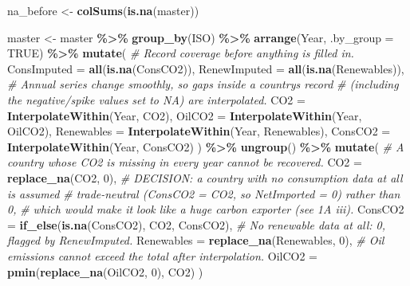 \documentclass[
]{article}
\newenvironment{Shaded}{\begin{snugshade}}{\end{snugshade}}
\newcommand{\AttributeTok}[1]{\textcolor[rgb]{0.13,0.29,0.53}{#1}}
\newcommand{\CommentTok}[1]{\textcolor[rgb]{0.56,0.35,0.01}{\textit{#1}}}
\newcommand{\ConstantTok}[1]{\textcolor[rgb]{0.56,0.35,0.01}{#1}}
\newcommand{\DecValTok}[1]{\textcolor[rgb]{0.00,0.00,0.81}{#1}}
\newcommand{\FunctionTok}[1]{\textcolor[rgb]{0.13,0.29,0.53}{\textbf{#1}}}
\newcommand{\NormalTok}[1]{#1}
\newcommand{\OtherTok}[1]{\textcolor[rgb]{0.56,0.35,0.01}{#1}}
\newcommand{\SpecialCharTok}[1]{\textcolor[rgb]{0.81,0.36,0.00}{\textbf{#1}}}
\begin{document}
\begin{Shaded}
\begin{Highlighting}[]
\NormalTok{na\_before }\OtherTok{\textless{}{-}} \FunctionTok{colSums}\NormalTok{(}\FunctionTok{is.na}\NormalTok{(master))}

\NormalTok{master }\OtherTok{\textless{}{-}}\NormalTok{ master }\SpecialCharTok{\%\textgreater{}\%}
  \FunctionTok{group\_by}\NormalTok{(ISO) }\SpecialCharTok{\%\textgreater{}\%}
  \FunctionTok{arrange}\NormalTok{(Year, }\AttributeTok{.by\_group =} \ConstantTok{TRUE}\NormalTok{) }\SpecialCharTok{\%\textgreater{}\%}
  \FunctionTok{mutate}\NormalTok{(}
    \CommentTok{\# Record coverage before anything is filled in.}
    \AttributeTok{ConsImputed =} \FunctionTok{all}\NormalTok{(}\FunctionTok{is.na}\NormalTok{(ConsCO2)),}
    \AttributeTok{RenewImputed =} \FunctionTok{all}\NormalTok{(}\FunctionTok{is.na}\NormalTok{(Renewables)),}
    \CommentTok{\# Annual series change smoothly, so gaps inside a country\textquotesingle{}s record}
    \CommentTok{\# (including the negative/spike values set to NA) are interpolated.}
    \AttributeTok{CO2 =} \FunctionTok{InterpolateWithin}\NormalTok{(Year, CO2),}
    \AttributeTok{OilCO2 =} \FunctionTok{InterpolateWithin}\NormalTok{(Year, OilCO2),}
    \AttributeTok{Renewables =} \FunctionTok{InterpolateWithin}\NormalTok{(Year, Renewables),}
    \AttributeTok{ConsCO2 =} \FunctionTok{InterpolateWithin}\NormalTok{(Year, ConsCO2)}
\NormalTok{  ) }\SpecialCharTok{\%\textgreater{}\%}
  \FunctionTok{ungroup}\NormalTok{() }\SpecialCharTok{\%\textgreater{}\%}
  \FunctionTok{mutate}\NormalTok{(}
    \CommentTok{\# A country whose CO2 is missing in every year cannot be recovered.}
    \AttributeTok{CO2 =} \FunctionTok{replace\_na}\NormalTok{(CO2, }\DecValTok{0}\NormalTok{),}
    \CommentTok{\# DECISION: a country with no consumption data at all is assumed}
    \CommentTok{\# trade{-}neutral (ConsCO2 = CO2, so NetImported = 0) rather than 0,}
    \CommentTok{\# which would make it look like a huge carbon exporter (see 1A iii).}
    \AttributeTok{ConsCO2 =} \FunctionTok{if\_else}\NormalTok{(}\FunctionTok{is.na}\NormalTok{(ConsCO2), CO2, ConsCO2),}
    \CommentTok{\# No renewable data at all: 0, flagged by RenewImputed.}
    \AttributeTok{Renewables =} \FunctionTok{replace\_na}\NormalTok{(Renewables, }\DecValTok{0}\NormalTok{),}
    \CommentTok{\# Oil emissions cannot exceed the total after interpolation.}
    \AttributeTok{OilCO2 =} \FunctionTok{pmin}\NormalTok{(}\FunctionTok{replace\_na}\NormalTok{(OilCO2, }\DecValTok{0}\NormalTok{), CO2)}
\NormalTok{  )}


\end{Highlighting}
\end{Shaded}
\end{document}
